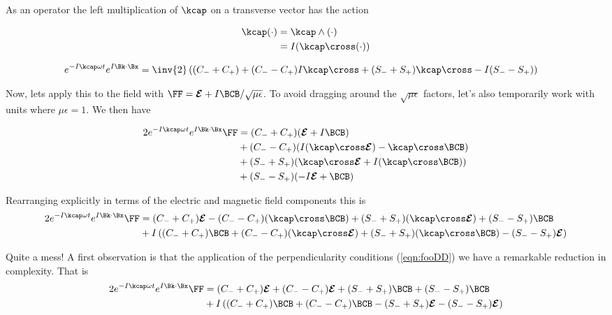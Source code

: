 As an operator the left multiplication of $\kcap$ on a transverse vector has the action

\begin{align*}
\kcap ( \cdot ) 
&= \kcap \wedge (\cdot) \\
&= I (\kcap \cross (\cdot)) \\
\end{align*}

\begin{align*}
e^{ -I \kcap \omega t } e^{ I \Bk \cdot \Bx }
&=
\inv{2}
\left( 
(C_{-} + C_{+})
+(C_{-} - C_{+}) I \kcap \cross
+(S_{-} + S_{+}) \kcap \cross
-I (S_{-} - S_{+})
\right)
\end{align*}

Now, lets apply this to the field with $\FF = \EE + I\BCB/\sqrt{\mu\epsilon}$.  To avoid dragging around the $\sqrt{\mu\epsilon}$ factors, let's also temporarily
work with units where $\mu\epsilon = 1$.  We then have

\begin{align*}
2 e^{ -I \kcap \omega t } e^{ I \Bk \cdot \Bx } \FF
&= (C_{-} + C_{+}) (\EE + I\BCB) \\
&+ (C_{-} - C_{+}) (I (\kcap \cross \EE) - \kcap \cross \BCB) \\
&+ (S_{-} + S_{+}) (\kcap \cross \EE +I (\kcap \cross \BCB))  \\
&+ (S_{-} - S_{+}) (-I \EE + \BCB) 
\end{align*}

Rearranging explicitly in terms of the electric and magnetic field components this is
\begin{align*}
2 e^{ -I \kcap \omega t } e^{ I \Bk \cdot \Bx } \FF
&=
 (C_{-} + C_{+}) \EE 
-(C_{-} - C_{+}) (\kcap \cross \BCB)
+(S_{-} + S_{+}) (\kcap \cross \EE)
+(S_{-} - S_{+}) \BCB \\
&+{I}
\left( 
 (C_{-} + C_{+}) \BCB
+(C_{-} - C_{+}) (\kcap \cross \EE)
+(S_{-} + S_{+}) (\kcap \cross \BCB)
-(S_{-} - S_{+}) \EE 
\right) \\
\end{align*}

Quite a mess!  A first observation is that the application of the perpendicularity conditions (\ref{eqn:fooDD}) we have a remarkable reduction in complexity.  That is
\begin{align*}
2 e^{ -I \kcap \omega t } e^{ I \Bk \cdot \Bx } \FF
&=
 (C_{-} + C_{+}) \EE 
+(C_{-} - C_{+}) \EE
+(S_{-} + S_{+}) \BCB
+(S_{-} - S_{+}) \BCB
\\
&+{I}
\left( 
 (C_{-} + C_{+}) \BCB
+(C_{-} - C_{+}) \BCB
-(S_{-} + S_{+}) \EE
-(S_{-} - S_{+}) \EE 
\right) \\
\end{align*}

